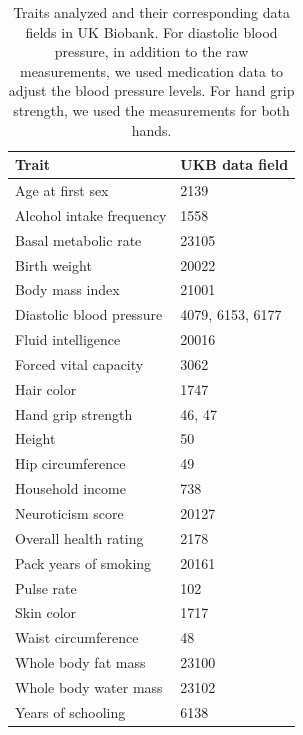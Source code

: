 \documentclass[hidelinks, 12pt]{article}
\begin{document}
\begin{table}[h]
\caption[Traits analyzed and their corresponding data fields in UK Biobank.]{\small Traits analyzed and their corresponding data fields in UK Biobank. For diastolic blood pressure, in addition to the raw measurements, we used medication data to adjust the blood pressure levels. For hand grip strength, we used the measurements for both hands.}
\begin{center}
 \begin{tabular}{| l l |} 
 \hline
 \textbf{Trait} & \textbf{UKB data field} \\ [0.5ex] 
 \hline\hline
  Age at first sex & 2139  \\ 
  Alcohol intake frequency & 1558  \\
  Basal metabolic rate & 23105  \\ 
  Birth weight & 20022  \\ 
  Body mass index & 21001  \\
  Diastolic blood pressure & 4079, 6153, 6177  \\ 
  Fluid intelligence & 20016  \\ 
  Forced vital capacity & 3062  \\ 
  Hair color & 1747  \\ 
  Hand grip strength & 46, 47  \\ 
  Height & 50  \\ 
  Hip circumference & 49  \\ 
  Household income & 738  \\ 
  Neuroticism score & 20127  \\ 
  Overall health rating & 2178  \\ 
  Pack years of smoking & 20161  \\ 
  Pulse rate & 102  \\ 
  Skin color & 1717  \\ 
  Waist circumference & 48  \\ 
  Whole body fat mass & 23100  \\ 
  Whole body water mass & 23102  \\ 
  Years of schooling & 6138 \\ 
   \hline
 \end{tabular}
\end{center}
\end{table}

\pagebreak
\end{document}
